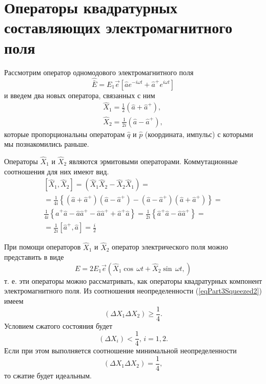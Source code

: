 \section{Операторы квадратурных составляющих электромагнитного
  поля}
Рассмотрим оператор одномодового электромагнитного поля 
\begin{equation}
\hat{\bar{E}} = 
E_1 \vec{e}\left[
\hat{a} e^{-i\omega t} +
\hat{a}^{+} e^{i\omega t}
\right]
\nonumber
\end{equation}
и введем два новых оператора, связанных с ним
\begin{eqnarray}
\hat{X}_1 = \frac{1}{2}\left(\hat{a} + \hat{a}^{+}\right),
\nonumber \\
\hat{X}_2 = \frac{1}{2i}\left(\hat{a} - \hat{a}^{+}\right),
\nonumber
\end{eqnarray}
которые пропорциональны операторам $\hat{q}$ и $\hat{p}$ (координата,
импульс) с которыми мы познакомились раньше.

Операторы $\hat{X}_1$ и $\hat{X}_2$ являются эрмитовыми
операторами. Коммутационные соотношения для них имеют вид.
\begin{eqnarray}
\left[\hat{X}_1, \hat{X}_2\right] = 
\left(\hat{X}_1 \hat{X}_2 - \hat{X}_2 \hat{X}_1 \right) = 
\nonumber \\
=
\frac{1}{4i}
\left\{
\left(\hat{a} + \hat{a}^{+}\right)
\left(\hat{a} - \hat{a}^{+}\right)
-
\left(\hat{a} - \hat{a}^{+}\right)
\left(\hat{a} + \hat{a}^{+}\right)
\right\} = 
\nonumber \\
\frac{1}{4i}
\left\{
\hat{a}^{+}\hat{a}
- \hat{a}\hat{a}^{+}
- \hat{a}\hat{a}^{+}
+
\hat{a}^{+}\hat{a}
\right\} = 
\frac{1}{2i}
\left\{
\hat{a}^{+}\hat{a}
- \hat{a}\hat{a}^{+}
\right\} =
\nonumber \\
= 
\frac{1}{2i}
\left[\hat{a}^{+}, \hat{a}\right] = 
\frac{i}{2}
\nonumber
\end{eqnarray}

При помощи операторов $\hat{X}_1$ и $\hat{X}_2$ оператор
электрического поля можно представить в виде
\begin{equation}
E = 2 E_1 \vec{e}\left(
\hat{X}_1 \cos \, \omega t +
\hat{X}_2 \sin \, \omega t,
\right)
\nonumber
\end{equation}
т. е. эти операторы можно рассматривать, как операторы квадратурных
компонент электромагнитного поля. Из соотношения неопределенности
(\ref{eqPart3Squeezed2}) имеем
\begin{equation}
\left(
\Delta X_1 \Delta X_2
\right) \ge \frac{1}{4}.
\nonumber
\end{equation}
Условием сжатого состояния будет
\begin{equation}
\left(
\Delta X_i 
\right) < \frac{1}{4}, \, i = 1,2.
\nonumber
\end{equation}
Если при этом выполняется соотношение минимальной неопределенности
\begin{equation}
\left(
\Delta X_1 \Delta X_2
\right) = \frac{1}{4},
\nonumber
\end{equation}
то сжатие будет идеальным.


